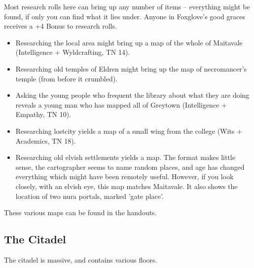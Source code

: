 Most research rolls here can bring up any number of items -- everything might be found, if only you can find what it lies under.
Anyone in Foxglove's good graces receives a +4 Bonus to research rolls.

\begin{itemize}

  \item
  Researching the local area might bring up a map of the whole of Maitavale (Intelligence + Wyldcrafting, TN 14).
  \item
  Researching old temples of Eldren might bring up the map of \gls{necromancer}'s temple (from before it crumbled).
  \item
  Asking the young people who frequent the library about what they are doing reveals a young man who has mapped all of Greytown (Intelligence + Empathy, TN 10).
  \item
  Researching \gls{lostcity} yields a map of a small wing from the \gls{college} (Wits + Academics, TN 18).
  \item
  Researching old elvish settlements yields a map.
  The format makes little sense, the cartographer seems to name random places, and age has changed everything which might have been remotely useful.
  However, if you look closely, with an elvish eye, this map matches Maitavale.
  It also shows the location of two nura portals, marked 'gate place'.

\end{itemize}

These various maps can be found in the handouts.

\subsection{The Citadel}
\label{citadel}

The citadel is massive, and contains various floors.

